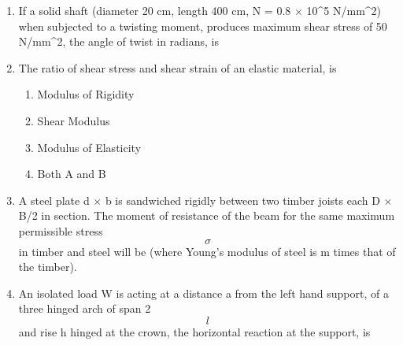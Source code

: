\documentclass[11pt,a4paper]{article}
\begin{document}
\begin{enumerate}
\item{If a solid shaft (diameter 20 cm, length 400 cm, N = 0.8 $\times$ 10\^{}5 N/mm\^{}2) when subjected to a twisting moment, produces maximum shear stress of 50 N/mm\^{}2, the angle of twist in radians, is
}
\\
\item{The ratio of shear stress and shear strain of an elastic material, is}
\begin{enumerate}[label=\Alph*.]
\item{Modulus of Rigidity}
\item{Shear Modulus}
\item{Modulus of Elasticity}
\item{Both A and B}
\end{enumerate}
\item{A steel plate d $\times$ b is sandwiched rigidly between two timber joists each D $\times$ B/2 in section. The moment of resistance of the beam for the same maximum permissible stress $$\sigma $$ in timber and steel will be (where Young's modulus of steel is m times that of the timber).
}
\\
\item{An isolated load W is acting at a distance a from the left hand support, of a three hinged arch of span 2$$l$$ and rise h hinged at the crown, the horizontal reaction at the support, is}
\\\begin{enumerate*}[itemjoin=\qquad, label=\Alph*.]

\end{enumerate*}
\end{enumerate}
\end{document}
